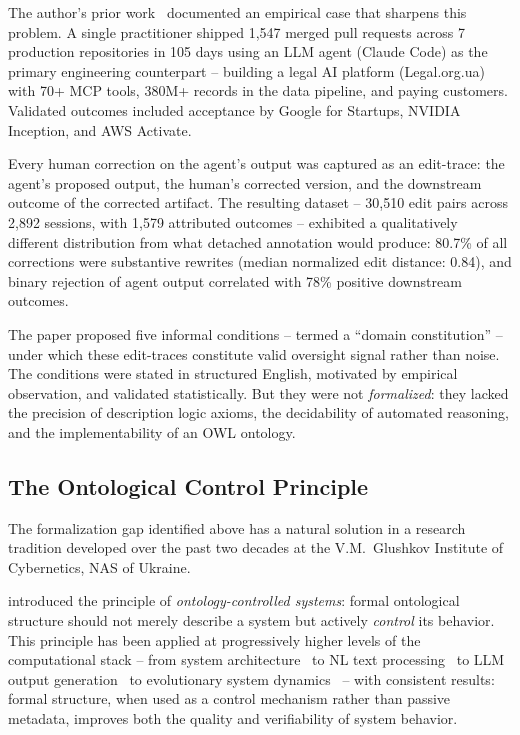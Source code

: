 \documentclass[11pt]{article}
\begin{document}
The author's prior work~\citep{ovcharov2025citation,ovcharov2025statute} documented an empirical case that sharpens this problem.
A single practitioner shipped 1{,}547 merged pull requests across 7 production repositories in 105 days using an LLM agent (Claude Code) as the primary engineering counterpart -- building a legal AI platform (Legal.org.ua) with 70+ MCP tools, 380M+ records in the data pipeline, and paying customers.
Validated outcomes included acceptance by Google for Startups, NVIDIA Inception, and AWS Activate.

Every human correction on the agent's output was captured as an edit-trace: the agent's proposed output, the human's corrected version, and the downstream outcome of the corrected artifact.
The resulting dataset -- 30{,}510 edit pairs across 2{,}892 sessions, with 1{,}579 attributed outcomes -- exhibited a qualitatively different distribution from what detached annotation would produce: 80.7\% of all corrections were substantive rewrites (median normalized edit distance: 0.84), and binary rejection of agent output correlated with 78\% positive downstream outcomes.

The paper proposed five informal conditions -- termed a ``domain constitution'' -- under which these edit-traces constitute valid oversight signal rather than noise.
The conditions were stated in structured English, motivated by empirical observation, and validated statistically.
But they were not \emph{formalized}: they lacked the precision of description logic axioms, the decidability of automated reasoning, and the implementability of an OWL ontology.

\subsection{The Ontological Control Principle}
\label{sec:principle}

The formalization gap identified above has a natural solution in a research tradition developed over the past two decades at the V.M.~Glushkov Institute of Cybernetics, NAS of Ukraine.

\citet{palagin2006architecture} introduced the principle of \emph{ontology-controlled systems}: formal ontological structure should not merely describe a system but actively \emph{control} its behavior.
This principle has been applied at progressively higher levels of the computational stack -- from system architecture~\citep{palagin2006architecture} to NL text processing~\citep{palagin2012knowledge, palagin2020distributional} to LLM output generation~\citep{palagin2023ontochatgpt, palagin2024neural} to evolutionary system dynamics~\citep{palagin2025evolutionary} -- with consistent results: formal structure, when used as a control mechanism rather than passive metadata, improves both the quality and verifiability of system behavior.
\end{document}
